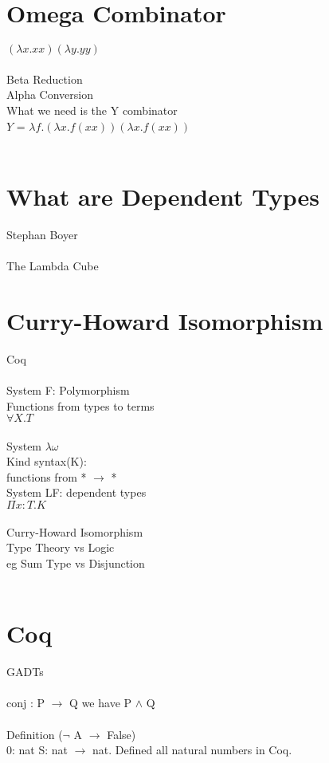 \documentclass{article}
\begin{document}
\section{Omega Combinator}
$(\lambda x. x x)(\lambda y . y y)$
\\
\\
Beta Reduction
\\
Alpha Conversion
\\
What we need is the Y combinator
\\
$Y$ = $\lambda f. (\lambda x . f (x x)) (\lambda x. f(x x))$
\\
\\
\section{What are Dependent Types}
Stephan Boyer
\\
\\
The Lambda Cube
\\
\section{Curry-Howard Isomorphism}
Coq
\\
\\
System F: Polymorphism
\\
Functions from types to terms
\\
$\forall X. T$
\\
\\
System $\lambda \omega$
\\
Kind syntax(K): 
\\
functions from * $\rightarrow$ *
\\
System LF: dependent types
\\
$\Pi x : T. K$
\\
\\
Curry-Howard Isomorphism
\\
Type Theory vs Logic
\\
eg Sum Type vs Disjunction
\\
\\
\section{Coq}
GADTs
\\
\\
conj : P $\rightarrow$ Q we have P $\land$ Q
\\
\\
Definition ($\neg$ A $\rightarrow$ False)
\\
0: nat
S: nat $\rightarrow$ nat.
Defined all natural numbers in Coq.
\\
\\
\end{document}
